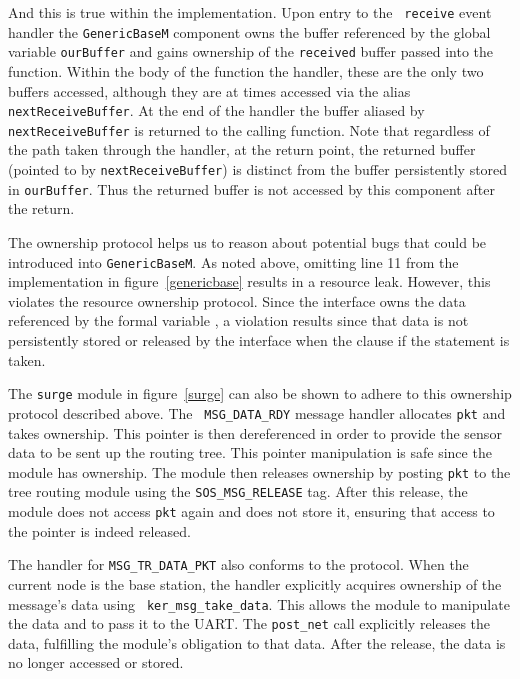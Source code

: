 And this is true within the implementation.  Upon entry to the {\tt
receive} event handler the {\tt GenericBaseM} component owns the
buffer referenced by the global variable {\tt ourBuffer} and gains
ownership of the {\tt received} buffer passed into the function.
Within the body of the function the handler, these are the only two
buffers accessed, although they are at times accessed via the alias
{\tt nextReceiveBuffer}.  At the end of the handler the buffer aliased
by {\tt nextReceiveBuffer} is returned to the calling function.  Note
that regardless of the path taken through the handler, at the return
point, the returned buffer (pointed to by {\tt nextReceiveBuffer}) is
distinct from the buffer persistently stored in {\tt ourBuffer}.  Thus
the returned buffer is not accessed by this component after the
return.

The ownership protocol helps us to reason about potential bugs that
could be introduced into {\tt GenericBaseM}.  As noted above, omitting
line 11 from the implementation in figure~\ref{genericbase} results in
a resource leak.  However, this violates the resource ownership
protocol.  Since the  interface owns the data referenced
by the formal variable , a violation results since that
data is not persistently stored or released by the interface when the
 clause if the  statement is taken.

\smallskip{}


The {\tt surge} module in figure~\ref{surge} can also be shown to
adhere to this ownership protocol described above.  The {\tt
MSG\_DATA\_RDY} message handler allocates {\tt pkt} and takes
ownership. This pointer is then dereferenced in order to provide the
sensor data to be sent up the routing tree.  This pointer manipulation
is safe since the module has ownership.  The module then releases
ownership by posting {\tt pkt} to the tree routing module using the
{\tt SOS\_MSG\_RELEASE} tag.  After this release, the module does not
access {\tt pkt} again and does not store it, ensuring that access to
the pointer is indeed released. 

The handler for {\tt MSG\_TR\_DATA\_PKT} also conforms to the
protocol.   When the current node is the base station, the handler
explicitly acquires ownership of the message's data using {\tt
ker\_msg\_take\_data}.  This allows the module to manipulate the data
and to pass it to the UART.  The {\tt post\_net} call explicitly
releases the data, fulfilling the module's obligation to that data.
After the release, the data is no longer accessed or stored.

